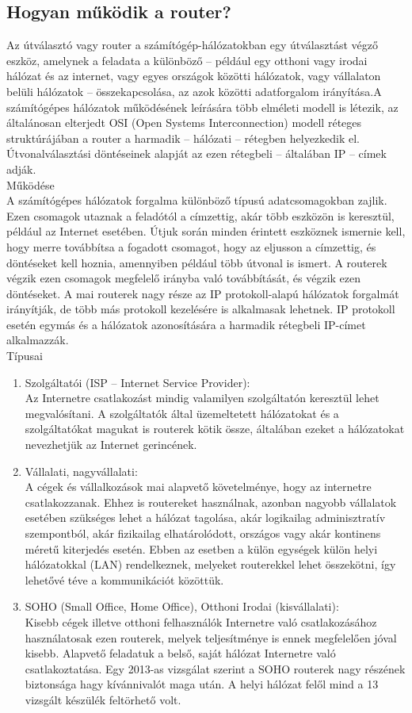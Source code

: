 \documentclass[12pt, a4paper]{article}
\begin{document}
\subsection{Hogyan működik a router?}
Az útválasztó vagy router a számítógép-hálózatokban egy útválasztást végző eszköz, amelynek a feladata a különböző – például egy otthoni vagy irodai hálózat és az internet, vagy egyes országok közötti hálózatok, vagy vállalaton belüli hálózatok – összekapcsolása, az azok közötti adatforgalom irányítása.A számítógépes hálózatok működésének leírására több elméleti modell is létezik, az általánosan elterjedt OSI (Open Systems Interconnection) modell réteges struktúrájában a router a harmadik – hálózati – rétegben helyezkedik el. Útvonalválasztási döntéseinek alapját az ezen rétegbeli – általában IP – címek adják.\\Működése\\
A számítógépes hálózatok forgalma különböző típusú adatcsomagokban zajlik. Ezen csomagok utaznak a feladótól a címzettig, akár több eszközön is keresztül, például az Internet esetében. Útjuk során minden érintett eszköznek ismernie kell, hogy merre továbbítsa a fogadott csomagot, hogy az eljusson a címzettig, és döntéseket kell hoznia, amennyiben például több útvonal is ismert. A routerek végzik ezen csomagok megfelelő irányba való továbbítását, és végzik ezen döntéseket. A mai routerek nagy része az IP protokoll-alapú hálózatok forgalmát irányítják, de több más protokoll kezelésére is alkalmasak lehetnek. IP protokoll esetén egymás és a hálózatok azonosítására a harmadik rétegbeli IP-címet alkalmazzák.\\Típusai\\
\begin{enumerate}
\item
Szolgáltatói (ISP – Internet Service Provider):\\ Az Internetre csatlakozást mindig valamilyen szolgáltatón keresztül lehet megvalósítani. A szolgáltatók által üzemeltetett hálózatokat és a szolgáltatókat magukat is routerek kötik össze, általában ezeket a hálózatokat nevezhetjük az Internet gerincének.
\item
Vállalati, nagyvállalati:\\ A cégek és vállalkozások mai alapvető követelménye, hogy az internetre csatlakozzanak. Ehhez is routereket használnak, azonban nagyobb vállalatok esetében szükséges lehet a hálózat tagolása, akár logikailag adminisztratív szempontból, akár fizikailag elhatárolódott, országos vagy akár kontinens méretű kiterjedés esetén. Ebben az esetben a külön egységek külön helyi hálózatokkal (LAN) rendelkeznek, melyeket routerekkel lehet összekötni, így lehetővé téve a kommunikációt közöttük.
\item
SOHO (Small Office, Home Office), Otthoni Irodai (kisvállalati):\\Kisebb cégek illetve otthoni felhasználók Internetre való csatlakozásához használatosak ezen routerek, melyek teljesítménye is ennek megfelelően jóval kisebb. Alapvető feladatuk a belső, saját hálózat Internetre való csatlakoztatása. Egy 2013-as vizsgálat szerint a SOHO routerek nagy részének biztonsága hagy kívánnivalót maga után. A helyi hálózat felől mind a 13 vizsgált készülék feltörhető volt.
\end{enumerate}
\end{document}
